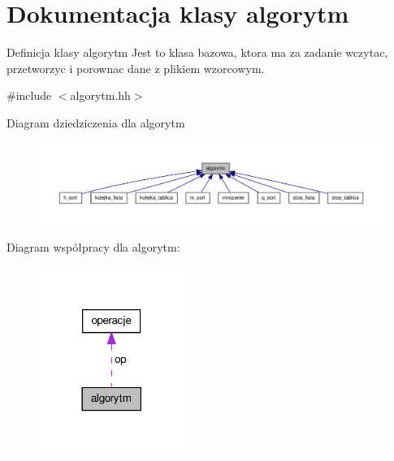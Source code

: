 \hypertarget{classalgorytm}{\section{\-Dokumentacja klasy algorytm}
\label{classalgorytm}
}


\-Definicja klasy algorytm \-Jest to klasa bazowa, ktora ma za zadanie wczytac, przetworzyc i porownac dane z plikiem wzorcowym.  




{\ttfamily \#include $<$algorytm.\-hh$>$}



\-Diagram dziedziczenia dla algorytm
\nopagebreak
\begin{figure}[H]
\begin{center}
\leavevmode
\includegraphics[width=350pt]{classalgorytm__inherit__graph}
\end{center}
\end{figure}


\-Diagram współpracy dla algorytm\-:
\nopagebreak
\begin{figure}[H]
\begin{center}
\leavevmode
\includegraphics[width=134pt]{classalgorytm__coll__graph}
\end{center}
\end{figure}
